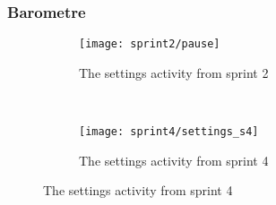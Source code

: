 \begin{frame}
\frametitle{Barometre}
\begin{figure}
\begin{subfigure}[b]{0.4\textwidth}
\texttt{[image: sprint2/pause]}
\caption{The settings activity from sprint 2}
\end{subfigure}
~
\begin{subfigure}[b]{0.4\textwidth}
\texttt{[image: sprint4/settings\_s4]}
\caption{The settings activity from sprint 4}
\end{subfigure}
\end{figure}
\end{frame}